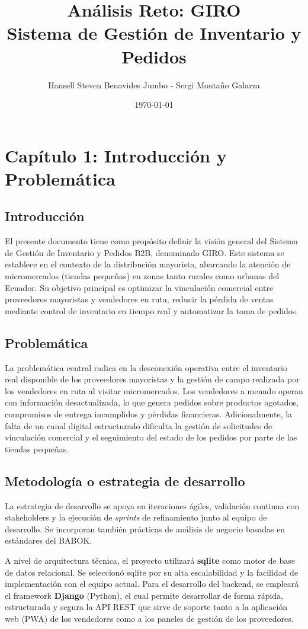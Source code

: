 \documentclass[12pt,a4paper]{report}
\title{Análisis Reto: GIRO \\ Sistema de Gestión de Inventario y Pedidos}
\author{Hansell Steven Benavides Jumbo - Sergi Montaño Galarza}
\date{\today}
\begin{document}
	
	\maketitle
	\tableofcontents
	\newpage
	
	\chapter{Capítulo 1: Introducción y Problemática}
	
	\section{Introducción}
	El presente documento tiene como propósito definir la visión general del Sistema de Gestión de Inventario y Pedidos B2B, denominado GIRO. Este sistema se establece en el contexto de la distribución mayorista, abarcando la atención de micromercados (tiendas pequeñas) en zonas tanto rurales como urbanas del Ecuador. Su objetivo principal es optimizar la vinculación comercial entre proveedores mayoristas y vendedores en ruta, reducir la pérdida de ventas mediante control de inventario en tiempo real y automatizar la toma de pedidos.
	
	\section{Problemática}
	La problemática central radica en la desconexión operativa entre el inventario real disponible de los proveedores mayoristas y la gestión de campo realizada por los vendedores en ruta al visitar micromercados. Los vendedores a menudo operan con información desactualizada, lo que genera pedidos sobre productos agotados, compromisos de entrega incumplidos y pérdidas financieras. Adicionalmente, la falta de un canal digital estructurado dificulta la gestión de solicitudes de vinculación comercial y el seguimiento del estado de los pedidos por parte de las tiendas pequeñas.
	
	\section{Metodología o estrategia de desarrollo}
	La estrategia de desarrollo se apoya en iteraciones ágiles, validación continua con stakeholders y la ejecución de \textit{sprints} de refinamiento junto al equipo de desarrollo. Se incorporan también prácticas de análisis de negocio basadas en estándares del BABOK.
	
	A nivel de arquitectura técnica, el proyecto utilizará \textbf{sqlite} como motor de base de datos relacional. Se seleccionó sqlite por su alta escalabilidad y la facilidad de implementación con el equipo actual. Para el desarrollo del backend, se empleará el framework \textbf{Django} (Python), el cual permite desarrollar de forma rápida, estructurada y segura la API REST que sirve de soporte tanto a la aplicación web (PWA) de los vendedores como a los paneles de gestión de los proveedores.
	
\end{document}
